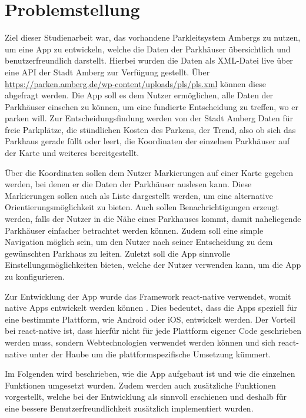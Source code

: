\chapter{Problemstellung}
\label{chap:1}

Ziel dieser Studienarbeit war, das vorhandene Parkleitsystem Ambergs zu nutzen, um eine App zu entwickeln, welche die Daten der Parkhäuser übersichtlich und benutzerfreundlich darstellt. Hierbei wurden die Daten als XML-Datei live über eine API der Stadt Amberg zur Verfügung gestellt. Über \url{https://parken.amberg.de/wp-content/uploads/pls/pls.xml} können diese abgefragt werden. Die App soll es dem Nutzer ermöglichen, alle Daten der Parkhäuser einsehen zu können, um eine fundierte Entscheidung zu treffen, wo er parken will. Zur Entscheidungsfindung werden von der Stadt Amberg Daten für freie Parkplätze, die stündlichen Kosten des Parkens, der Trend, also ob sich das Parkhaus gerade füllt oder leert, die Koordinaten der einzelnen Parkhäuser auf der Karte und weiteres bereitgestellt.

Über die Koordinaten sollen dem Nutzer Markierungen auf einer Karte gegeben werden, bei denen er die Daten der Parkhäuser auslesen kann. Diese Markierungen sollen auch als Liste dargestellt werden, um eine alternative Orientierungsmöglichkeit zu bieten. Auch sollen Benachrichtigungen erzeugt werden, falls der Nutzer in die Nähe eines Parkhauses kommt, damit naheliegende Parkhäuser einfacher betrachtet werden können. Zudem soll eine simple Navigation möglich sein, um den Nutzer nach seiner Entscheidung zu dem gewünschten Parkhaus zu leiten. Zuletzt soll die App sinnvolle Einstellungsmöglichkeiten bieten, welche der Nutzer verwenden kann, um die App zu konfigurieren.

Zur Entwicklung der App wurde das Framework react-native verwendet, womit native Apps entwickelt werden können \cite{ReactNative}. Dies bedeutet, dass die Apps speziell für eine bestimmte Plattform, wie Android oder iOS, entwickelt werden. Der Vorteil bei react-native ist, dass hierfür nicht für jede Plattform eigener Code geschrieben werden muss, sondern Webtechnologien verwendet werden können und sich react-native unter der Haube um die plattformspezifische Umsetzung kümmert.

Im Folgenden wird beschrieben, wie die App aufgebaut ist und wie die einzelnen Funktionen umgesetzt wurden. Zudem werden auch zusätzliche Funktionen vorgestellt, welche bei der Entwicklung als sinnvoll erschienen und deshalb für eine bessere Benutzerfreundlichkeit zusätzlich implementiert wurden.

